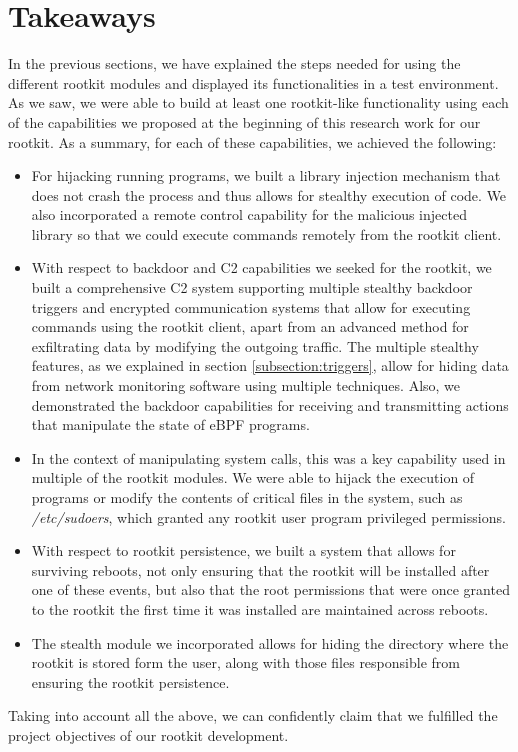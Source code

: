 \section{Takeaways}
In the previous sections, we have explained the steps needed for using the different rootkit modules and displayed its functionalities in a test environment. As we saw, we were able to build at least one rootkit-like functionality using each of the capabilities we proposed at the beginning of this research work for our rootkit. As a summary, for each of these capabilities, we achieved the following:
\begin{itemize}
\item For hijacking running programs, we built a library injection mechanism that does not crash the process and thus allows for stealthy execution of code. We also incorporated a remote control capability for the malicious injected library so that we could execute commands remotely from the rootkit client.
\item With respect to backdoor and C2 capabilities we seeked for the rootkit, we built a comprehensive C2 system supporting multiple stealthy backdoor triggers and encrypted communication systems that allow for executing commands using the rootkit client, apart from an advanced method for exfiltrating data by modifying the outgoing traffic. The multiple stealthy features, as we explained in section \ref{subsection:triggers}, allow for hiding data from network monitoring software using multiple techniques. Also, we demonstrated the backdoor capabilities for receiving and transmitting actions that manipulate the state of eBPF programs.
\item In the context of manipulating system calls, this was a key capability used in multiple of the rootkit modules. We were able to hijack the execution of programs or modify the contents of critical files in the system, such as \textit{/etc/sudoers}, which granted any rootkit user program privileged permissions.
\item With respect to rootkit persistence, we built a system that allows for surviving reboots, not only ensuring that the rootkit will be installed after one of these events, but also that the root permissions that were once granted to the rootkit the first time it was installed are maintained across reboots.
\item The stealth module we incorporated allows for hiding the directory where the rootkit is stored form the user, along with those files responsible from ensuring the rootkit persistence.
\end{itemize}

Taking into account all the above, we can confidently claim that we fulfilled the project objectives of our rootkit development.

